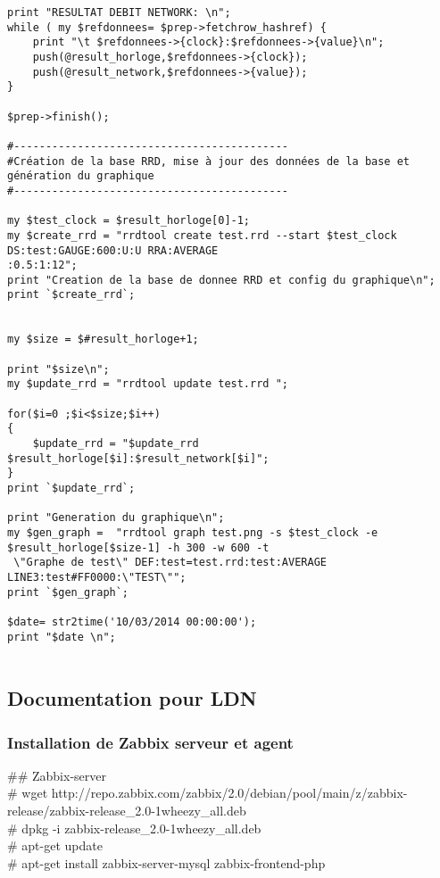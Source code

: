 \begin{verbatim}
print "RESULTAT DEBIT NETWORK: \n";
while ( my $refdonnees= $prep->fetchrow_hashref) {
	print "\t $refdonnees->{clock}:$refdonnees->{value}\n";
	push(@result_horloge,$refdonnees->{clock});
	push(@result_network,$refdonnees->{value});
}

$prep->finish(); 

#-------------------------------------------
#Création de la base RRD, mise à jour des données de la base et génération du graphique
#-------------------------------------------

my $test_clock = $result_horloge[0]-1;
my $create_rrd = "rrdtool create test.rrd --start $test_clock DS:test:GAUGE:600:U:U RRA:AVERAGE
:0.5:1:12";
print "Creation de la base de donnee RRD et config du graphique\n";
print `$create_rrd`;


my $size = $#result_horloge+1;

print "$size\n";
my $update_rrd = "rrdtool update test.rrd ";

for($i=0 ;$i<$size;$i++)
{
	$update_rrd = "$update_rrd $result_horloge[$i]:$result_network[$i]"; 
} 
print `$update_rrd`;

print "Generation du graphique\n";
my $gen_graph =  "rrdtool graph test.png -s $test_clock -e $result_horloge[$size-1] -h 300 -w 600 -t
 \"Graphe de test\" DEF:test=test.rrd:test:AVERAGE LINE3:test#FF0000:\"TEST\"";
print `$gen_graph`;

$date= str2time('10/03/2014 00:00:00');
print "$date \n";


\end{verbatim}

\newpage

	\subsection{\label{docLDN}Documentation pour LDN}

		\subsubsection{Installation de Zabbix serveur et agent}

	\vspace{0.3cm}

	\#\# Zabbix-server\\
	\# wget http://repo.zabbix.com/zabbix/2.0/debian/pool/main/z/zabbix-release/zabbix-release\_2.0-1wheezy\_all.deb\\
	\# dpkg -i zabbix-release\_2.0-1wheezy\_all.deb\\
	\# apt-get update\\
	\# apt-get install zabbix-server-mysql zabbix-frontend-php\\


